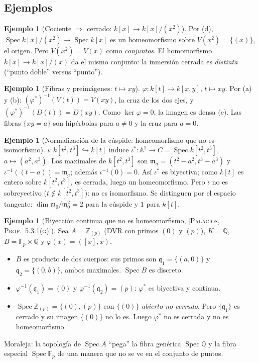 \documentclass[11pt,a4paper]{article}
\newcommand{\Spec}{\operatorname{Spec}}
\newcommand{\A}{\mathbb{A}}
\newcommand{\ZZ}{\mathbb{Z}}
\newcommand{\QQ}{\mathbb{Q}}
\newcommand{\FF}{\mathbb{F}}
\newcommand{\qq}{\mathfrak{q}}
\newcommand{\mm}{\mathfrak{m}}
\theoremstyle{plain}
\theoremstyle{definition}
\newtheorem{ejemplo}[teorema]{Ejemplo}
\theoremstyle{remark}
\newcounter{ej}
\newcommand{\libro}[1]{\textsc{[Palacios, #1]}}
\begin{document}
\subsection{Ejemplos}

\begin{ejemplo}[{Cociente $\Rightarrow$ cerrado: $k[x]\to k[x]/(x^2)$}]\label{ej:cociente}
Por (d), $\Spec k[x]/(x^2)\to\Spec k[x]$ es un homeomorfismo sobre $V(x^2)=\{(x)\}$, el origen. Pero $V(x^2)=V(x)$ como \emph{conjuntos}. El homomorfismo $k[x]\to k[x]/(x)$ da el mismo conjunto: la inmersión cerrada es \emph{distinta} (``punto doble'' versus ``punto'').
\end{ejemplo}

\begin{ejemplo}[{Fibras y preimágenes: $t\mapsto xy$}]\label{ej:fibra}
$\varphi:k[t]\to k[x,y]$, $t\mapsto xy$. Por (a) y (b): $(\varphi^*)^{-1}(V(t))=V(xy)$, la cruz de los dos ejes, y $(\varphi^*)^{-1}(D(t))=D(xy)$. Como $\ker\varphi=0$, la imagen es densa (e). Las fibras $\{xy=a\}$ son hipérbolas para $a\ne0$ y la cruz para $a=0$.
\end{ejemplo}

\begin{ejemplo}[{Normalización de la cúspide: homeomorfismo que no es isomorfismo}]\label{ej:cuspide}
$\iota:k[t^2,t^3]\hookrightarrow k[t]$ induce $\iota^*:\A^1\to C=\Spec k[t^2,t^3]$, $a\mapsto(a^2,a^3)$. Los maximales de $k[t^2,t^3]$ son $\mm_a=(t^2-a^2,t^3-a^3)$ y $\iota^{-1}((t-a))=\mm_a$; además $\iota^{-1}(0)=0$. Así $\iota^*$ es biyectiva; como $k[t]$ es entero sobre $k[t^2,t^3]$, es cerrada, luego un homeomorfismo. Pero $\iota$ no es sobreyectivo ($t\notin k[t^2,t^3]$): no es isomorfismo. Se distinguen por el espacio tangente: $\dim\mm_0/\mm_0^2=2$ para la cúspide y $1$ para $k[t]$.
\end{ejemplo}

\begin{ejemplo}[{Biyección continua que no es homeomorfismo, \libro{Prop.~5.3.1(g)}}]\label{ej:zp}
Sea $A=\ZZ_{(p)}$ (DVR con primos $(0)$ y $(p)$), $K=\QQ$, $B=\FF_p\times\QQ$ y $\varphi(x)=([x],x)$.
\begin{itemize}[itemsep=1pt]
\item $B$ es producto de dos cuerpos: sus primos son $\qq_1=\{(a,0)\}$ y $\qq_2=\{(0,b)\}$, ambos maximales. $\Spec B$ es discreto.
\item $\varphi^{-1}(\qq_1)=(0)$ y $\varphi^{-1}(\qq_2)=(p)$: $\varphi^*$ es biyectiva y continua.
\item $\Spec\ZZ_{(p)}=\{(0),(p)\}$ con $\{(0)\}$ \emph{abierto no cerrado}. Pero $\{\qq_1\}$ es cerrado y su imagen $\{(0)\}$ no lo es. Luego $\varphi^*$ no es cerrada y no es homeomorfismo.
\end{itemize}
Moraleja: la topología de $\Spec A$ ``pega'' la fibra genérica $\Spec\QQ$ y la fibra especial $\Spec\FF_p$ de una manera que no se ve en el conjunto de puntos.
\end{ejemplo}
\end{document}
